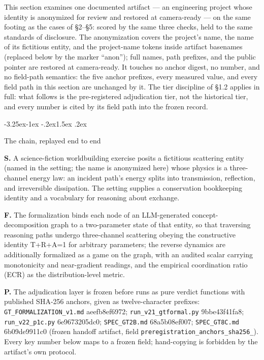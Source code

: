 \documentclass[11pt,a4paper]{article}
\makeatletter
\renewcommand\subsection{\@startsection{subsection}{2}{\z@}%
  {-3.25ex\@plus -1ex \@minus -.2ex}{1.5ex \@plus .2ex}%
  {\normalfont\large\bfseries\raggedright}}
\makeatother
\begin{document}
This section examines one documented artifact — an engineering project whose identity is anonymized for review and restored at camera-ready — on the same footing as the cases of §2–§5: scored by the same three checks, held to the same standards of disclosure. The anonymization covers the project's name, the name of its fictitious entity, and the project-name tokens inside artifact basenames (replaced below by the marker ``anon''); full names, path prefixes, and the public pointer are restored at camera-ready. It touches no anchor digest, no number, and no field-path semantics: the five anchor prefixes, every measured value, and every field path in this section are unchanged by it. The tier discipline of §1.2 applies in full: what follows is the pre-registered adjudication tier, not the historical tier, and every number is cited by its field path into the frozen record.

\subsection{The chain, replayed end to end}

\textbf{S.} A science-fiction worldbuilding exercise posits a fictitious scattering entity (named in the setting; the name is anonymized here) whose physics is a three-channel energy law: an incident path's energy splits into transmission, reflection, and irreversible dissipation. The setting supplies a conservation bookkeeping identity and a vocabulary for reasoning about exchange.

\textbf{F.} The formalization binds each node of an LLM-generated concept-decomposition graph to a two-parameter state of that entity, so that traversing reasoning paths undergo three-channel scattering obeying the constructive identity T+R+A=1 for arbitrary parameters; the reverse dynamics are additionally formalized as a game on the graph, with an audited scalar carrying monotonicity and near-gradient readings, and the empirical coordination ratio (ECR) as the distribution-level metric.

\textbf{P.} The adjudication layer is frozen before runs as pure verdict functions with published SHA-256 anchors, given as twelve-character prefixes: \texttt{GT\_\allowbreak FORMALIZATION\_\allowbreak v1.md} aeefb8ef6972; \texttt{run\_\allowbreak v21\_\allowbreak gtformal.py} 9bbe43f41fa8; \texttt{run\_\allowbreak v22\_\allowbreak p1c.py} 6e9673205dc0; \texttt{SPEC\_\allowbreak GT2B.md} 68a5b08ef007; \texttt{SPEC\_\allowbreak GT8C.md} 6b09de9911c0 (frozen handoff artifact, field \texttt{preregistration\_\allowbreak anchors\_\allowbreak sha256\_}). Every key number below maps to a frozen field; hand-copying is forbidden by the artifact's own protocol.
\end{document}
